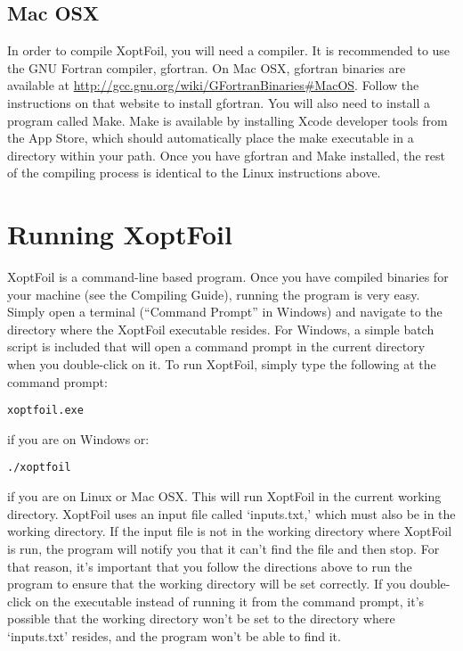 \documentclass[11pt]{article}
\begin{document}
\subsection{Mac OSX}

In order to compile XoptFoil, you will need a compiler.  It is recommended to use the GNU
Fortran compiler, gfortran.  On Mac OSX, gfortran binaries are available at 
\url{http://gcc.gnu.org/wiki/GFortranBinaries#MacOS}.  Follow the instructions on that
website to install gfortran.  You will also need to install a program called Make.  Make
is available by installing Xcode developer tools from the App Store, which should
automatically place the make executable in a directory within your path. Once you have
gfortran and Make installed, the rest of the compiling process is identical to the Linux
instructions above.

\section{Running XoptFoil}\label{sec:running}

XoptFoil is a command-line based program.  Once you have compiled binaries for your
machine (see the Compiling Guide), running the program is very easy.  Simply open a
terminal (``Command Prompt'' in Windows) and navigate to the directory where the XoptFoil
executable resides.  For Windows, a simple batch script is included that will open a
command prompt in the current directory when you double-click on it.  To run XoptFoil,
simply type the following at the command prompt:

\begin{verbatim}
xoptfoil.exe
\end{verbatim}

\noindent if you are on Windows or:

\begin{verbatim}
./xoptfoil
\end{verbatim}

\noindent if you are on Linux or Mac OSX.  This will run XoptFoil in the current working
directory.  XoptFoil uses an input file called `inputs.txt,' which must also be in the
working directory.  If the input file is not in the working directory where XoptFoil is
run, the program will notify you that it can't find the file and then stop.  For that
reason, it's important that you follow the directions above to run the program to ensure
that the working directory will be set correctly.  If you double-click on the executable
instead of running it from the command prompt, it's possible that the working directory
won't be set to the directory where `inputs.txt' resides, and the program won't be able to
find it.
\end{document}

